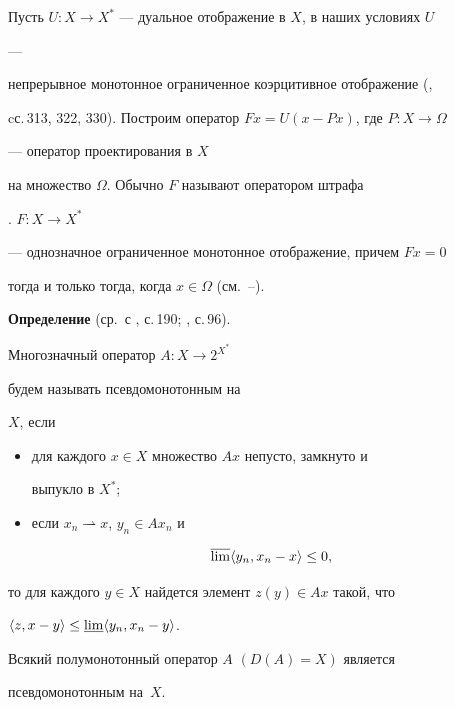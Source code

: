  


Пусть $U:X\to X^*$ --- дуальное отображение в $X$, в наших условиях $U$ 


--- 


непрерывное монотонное ограниченное коэрцитивное отображение (\cite{1}, 


cс.\,313, 322, 330). Построим оператор $Fx=U(x-Px)$, где $P:X\to\Omega$ 


--- оператор проектирования в $X$ 


на множество $\Omega$. Обычно $F$ называют оператором штрафа 


\cite{2}.\; $F:X\to X^*$ 


--- однозначное ограниченное монотонное отображение, причем $Fx=0$ 


тогда и только тогда, когда $x\in\Omega$ (см.~\cite{2}--\cite{4}). 


\medskip 


 


{\bf Определение} (ср.~с \cite{2}, с.\,190; \cite{4}, с.\,96). 


Многозначный оператор $A:X\to 2^{X^*}$ 


будем называть псевдомонотонным на 


$X$, если  


\begin{itemize} 


\item[a)] для каждого $x\in X$ множество $Ax$ непусто, замкнуто и 


выпукло в $X^*$; 


\item[б)] если $x_n\rightharpoonup x$, $y_n\in Ax_n$ и 


\begin{equation} 


\varlimsup\la y_n,x_n-x\ra\le 0, 


\end{equation} 


\end{itemize} 


то для каждого $y\in X$ найдется элемент $z(y)\in Ax$ такой, что 


$\langle z,x-y\rangle\le\varliminf\langle y_n,x_n-y\rangle$. 


 


\begin{lemnonum} 


Всякий полумонотонный оператор $A$ $(D(A)=X)$ является 


псевдомонотонным на~$X$. 


\end{lemnonum} 


